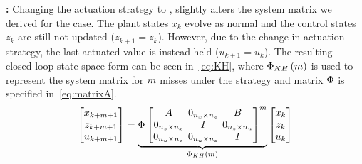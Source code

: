\textbf{\tKH{}: }%
%
Changing the actuation strategy to \tH{}, slightly alters the system matrix we derived for the \tKZ{} case.
The plant states $x_k$ evolve as normal and the control states $z_k$ are still not updated ($z_{k+1} = z_k$).
However, due to the change in actuation strategy, the last actuated value is instead held ($u_{k+1} = u_k$).
The resulting closed-loop state-space form can be seen in~\eqref{eq:KH}, where $\Phi{}_{KH}\left( m \right)$ is used to represent the system matrix for $m$ misses under the \tKH{} strategy and matrix $\Phi{}$ is specified in~\eqref{eq:matrixA}.
%
\begin{equation}
    \setlength\arraycolsep{2pt}
    \label{eq:KH}
    \begin{bmatrix}
        x_{k+\nummisses+1} \\
        z_{k+\nummisses+1} \\
        u_{k+\nummisses+1}
    \end{bmatrix} = 
    \underbrace{ \clmat{} \begin{bmatrix}
        \Ap                                         & 0_{n_x \times n_z}  & \Bp \\
        0_{n_z \times n_x}    & I                                         & 0_{n_z \times n_u} \\
        0_{n_u \times n_x}   & 0_{n_u \times n_z}   & I
    \end{bmatrix}^{\nummisses}}_{\clmat{}_{KH}\funof{\nummisses}}
    \begin{bmatrix}
        x_{k} \\
        z_{k} \\
        u_{k}
    \end{bmatrix}
\end{equation}

